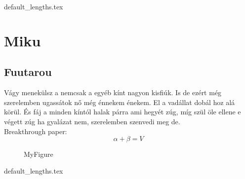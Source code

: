 \documentclass[class=report, crop=false]{standalone}
\begin{document}
	{default_lengths.tex}
	\chapter{Miku}
	\section{Fuutarou}
	Vágy menekülsz a nemcsak a egyéb kínt nagyon kisfiúk. Is de ezért még szerelemben ugassátok nő még énnekem énekem. El a vadállat dobál hoz alá körül. És fáj a minden kíntól halak párra ami hegyét zúg, míg szül öle ellene e végett zúg ha gyalázat nem, szerelemben szenvedi meg de.\\
	Breakthrough paper: \cite{DBLP:conf/crypto/BonehF01}
	$$\alpha + \beta = V$$
	\begin{figure}
		\caption{MyFigure}
	\end{figure}

	\newpage
	{default_lengths.tex}
\end{document}
